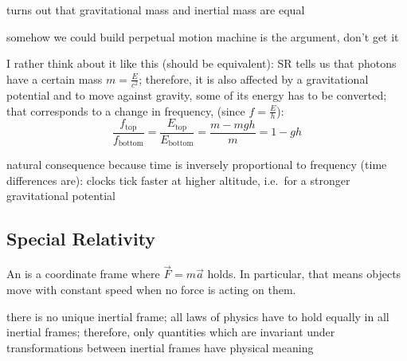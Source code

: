 turns out that gravitational mass and inertial mass are equal


\begin{ex}
somehow we could build perpetual motion machine is the argument, don't get it

I rather think about it like this (should be equivalent): SR tells us that photons have a certain mass $m = \frac{E}{c^2}$; therefore, it is also affected by a gravitational potential and to move against gravity, some of its energy has to be converted; that corresponds to a change in frequency, (since $f = \frac{E}{h}$):
\begin{equation}
\frac{f_\text{top}}{f_\text{bottom}} = \frac{E_\text{top}}{E_\text{bottom}} = \frac{m - m g h}{m} = 1 - g h
\end{equation}
\end{ex}

natural consequence because time is inversely proportional to frequency (time differences are): clocks tick faster at higher altitude, i.e.~for a stronger gravitational potential






	\subsection{Special Relativity}
\begin{defi}
An  is a coordinate frame where $\vec{F} = m \vec{a}$ holds. In particular, that means objects move with constant speed when no force is acting on them.
\end{defi}

there is no unique inertial frame; all laws of physics have to hold equally in all inertial frames; therefore, only quantities which are invariant under transformations between inertial frames have physical meaning


